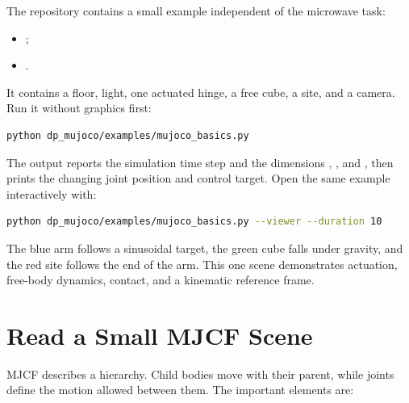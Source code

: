 The repository contains a small example independent of the microwave task:

\begin{itemize}
  \item {};
  \item {}.
\end{itemize}

It contains a floor, light, one actuated hinge, a free cube, a site, and a
camera. Run it without graphics first:

\begin{lstlisting}[language=bash]
python dp_mujoco/examples/mujoco_basics.py
\end{lstlisting}

The output reports the simulation time step and the dimensions ,
, and , then prints the changing joint position and
control target. Open the same example interactively with:

\begin{lstlisting}[language=bash]
python dp_mujoco/examples/mujoco_basics.py --viewer --duration 10
\end{lstlisting}

The blue arm follows a sinusoidal target, the green cube falls under gravity,
and the red site follows the end of the arm. This one scene demonstrates
actuation, free-body dynamics, contact, and a kinematic reference frame.

\section{Read a Small MJCF Scene}

MJCF describes a hierarchy. Child bodies move with their parent, while joints
define the motion allowed between them. The important elements are:


